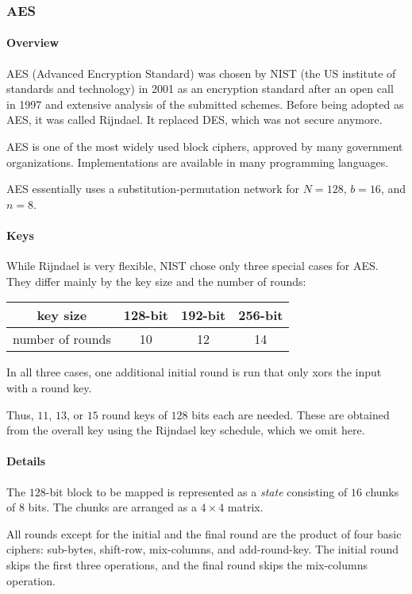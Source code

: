 \subsubsection{AES}

\paragraph{Overview}
AES (Advanced Encryption Standard) was chosen by NIST (the US institute of standards and technology) in 2001 as an encryption standard after an open call in 1997 and extensive analysis of the submitted schemes.
Before being adopted as AES, it was called Rijndael.
It replaced DES, which was not secure anymore.

AES is one of the most widely used block ciphers, approved by many government organizations.
Implementations are available in many programming languages.

AES essentially uses a substitution-permutation network for $N=128$, $b=16$, and $n=8$.

\paragraph{Keys}
While Rijndael is very flexible, NIST chose only three special cases for AES.
They differ mainly by the key size and the number of rounds:
\begin{center}
  \begin{tabular}{|c|c|c|c|}
  	\hline key size & 128-bit & 192-bit & 256-bit \\ 
  	\hline number of rounds & 10 & 12 & 14 \\ 
  	\hline
  \end{tabular}
\end{center}
In all three cases, one additional initial round is run that only xors the input with a round key.

Thus, $11$, $13$, or $15$ round keys of $128$ bits each are needed.
These are obtained from the overall key using the Rijndael key schedule, which we omit here.

\paragraph{Details}
The $128$-bit block to be mapped is represented as a \emph{state} consisting of $16$ chunks of $8$ bits. The chunks are arranged as a $4\times 4$ matrix.

All rounds except for the initial and the final round are the product of four basic ciphers: sub-bytes, shift-row, mix-columns, and add-round-key.
The initial round skips the first three operations, and the final round skips the mix-columns operation.

